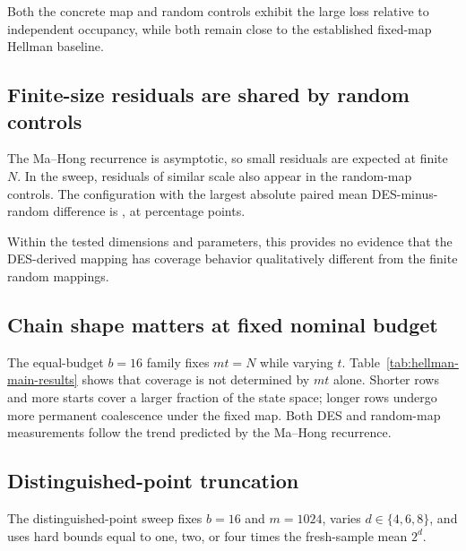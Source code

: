Both the concrete map and random controls exhibit the large loss relative to
independent occupancy, while both remain close to the established fixed-map
Hellman baseline.

\subsection{Finite-size residuals are shared by random controls}

The Ma--Hong recurrence is asymptotic, so small residuals are expected at
finite $N$. In the sweep, residuals of similar scale also appear in the
random-map controls. The configuration with the largest absolute paired mean
DES-minus-random difference is \LargestDeltaConfig{}, at
\LargestPairedMeanPP{} percentage points.

Within the tested dimensions and parameters, this provides no evidence that
the DES-derived mapping has coverage behavior qualitatively different from the
finite random mappings.

\subsection{Chain shape matters at fixed nominal budget}

The equal-budget $b=16$ family fixes $mt=N$ while varying $t$.
Table~\ref{tab:hellman-main-results} shows that coverage is not determined by
$mt$ alone. Shorter rows and more starts cover a larger fraction of the state
space; longer rows undergo more permanent coalescence under the fixed map.
Both DES and random-map measurements follow the trend predicted by the
Ma--Hong recurrence.

\subsection{Distinguished-point truncation}

The distinguished-point sweep fixes $b=16$ and $m=1024$, varies
$d\in\{4,6,8\}$, and uses hard bounds equal to one, two, or four times the
fresh-sample mean $2^d$.

\begin{table}[ht]
\centering
\small

\caption{Distinguished-point results over 30 trials. ``Fresh trunc.'' is
$(1-2^{-d})^L$; DES and random truncation columns are measured medians.
Coverage is the exact fraction represented by stored DES-derived rows, with
truncated rows excluded according to Section~\ref{sec:model}.}
\label{tab:dp-main-results}
\end{table}

